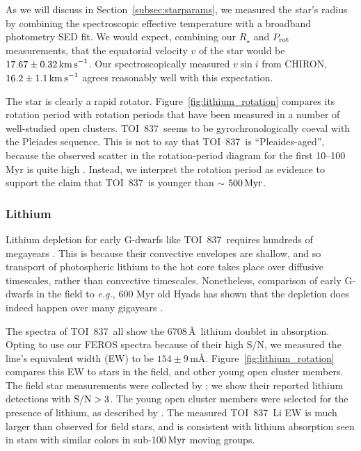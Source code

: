 \documentclass[12pt,twocolumn,tighten]{aastex63}
\newcommand{\tn}{TOI~837} %
\begin{document}
As we will discuss in Section~\ref{subsec:starparams}, we measured the
star's radius by combining the spectroscopic effective temperature
with a broadband photometry SED fit.  We would expect, combining our
$R_\star$ and $P_{\rm rot}$ measurements, that the equatorial velocity
$v$ of the star would be $17.67 \pm 0.32 \,{\rm km\,s}^{-1}$.  Our
spectroscopically measured $v\sin i$ from CHIRON, $16.2 \pm 1.1 \,{\rm
km\,s}^{-1}$ agrees reasonably well with this expectation.

The star is clearly a rapid rotator.
Figure~\ref{fig:lithium_rotation} compares its rotation period with
rotation periods that have been measured in a number of well-studied
open clusters.  \tn\ seems to be gyrochronologically coeval with the
Pleiades sequence.  This is not to say that \tn\ is ``Pleaides-aged'',
because the observed scatter in the rotation-period diagram for the
first 10--100$\,$Myr is quite high \citep[see Figure~9
of][]{rebull_rotation_2020}.  Instead, we interpret the rotation
period as evidence to support the claim that \tn\ is younger than
$\sim$ $500\,{\rm Myr}$.


\subsubsection{Lithium}

Lithium depletion for early G-dwarfs like \tn\ requires hundreds of
megayears \citep{soderblom_ages_2014}. This is because their
convective envelopes are shallow, and so transport of photospheric
lithium to the hot core takes place over diffusive timescales, rather
than convective timescales.  Nonetheless, comparison of early G-dwarfs
in the field to {\it e.g.}, 600 Myr old Hyads has shown that the
depletion does indeed happen over many gigayears
\citep{berger_identifying_2018}.

The spectra of \tn\ all show the 6708$\,$\AA\ lithium doublet in
absorption. Opting to use our FEROS spectra because of their high S/N,
we measured the line's equivalent width (EW) to be $154 \pm 9 \,
$m\AA.  Figure~\ref{fig:lithium_rotation} compares this EW to stars in
the field, and other young open cluster members.  The field star
measurements were collected by \citet{berger_identifying_2018}; we
show their reported lithium detections with ${\rm S/N}>3$.  The young
open cluster members were selected for the presence of lithium, as
described by \citet{randich_gaiaeso_2018}.  The measured \tn\ Li EW is
much larger than observed for field stars, and is consistent with
lithium absorption seen in stars with similar colors in sub-100$\,{\rm
Myr}$ moving groups.
\end{document}
